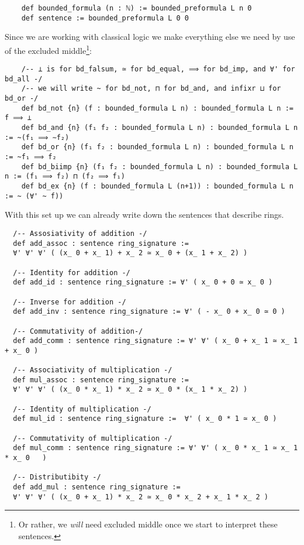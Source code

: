 \begin{dfn}[Formulas]
\begin{lstlisting}
    def bounded_formula (n : ℕ) := bounded_preformula L n 0
    def sentence := bounded_preformula L 0 0\end{lstlisting}

  Since we are working with classical logic we
  make everything else we need by use of the excluded middle\footnote{
    Or rather, we \textit{will} need excluded middle once we start to
    interpret these sentences.
  }:

  \begin{lstlisting}
    /-- ⊥ is for bd_falsum, ≃ for bd_equal, ⟹ for bd_imp, and ∀' for bd_all -/
    /-- we will write ~ for bd_not, ⊓ for bd_and, and infixr ⊔ for bd_or -/
    def bd_not {n} (f : bounded_formula L n) : bounded_formula L n := f ⟹ ⊥
    def bd_and {n} (f₁ f₂ : bounded_formula L n) : bounded_formula L n := ~(f₁ ⟹ ∼f₂)
    def bd_or {n} (f₁ f₂ : bounded_formula L n) : bounded_formula L n := ~f₁ ⟹ f₂
    def bd_biimp {n} (f₁ f₂ : bounded_formula L n) : bounded_formula L n := (f₁ ⟹ f₂) ⊓ (f₂ ⟹ f₁)
    def bd_ex {n} (f : bounded_formula L (n+1)) : bounded_formula L n := ~ (∀' ~ f))
  \end{lstlisting}
\end{dfn}

With this set up we can already write down the sentences that describe rings.

\begin{lstlisting}
  /-- Assosiativity of addition -/
  def add_assoc : sentence ring_signature :=
  ∀' ∀' ∀' ( (x_ 0 + x_ 1) + x_ 2 ≃ x_ 0 + (x_ 1 + x_ 2) )

  /-- Identity for addition -/
  def add_id : sentence ring_signature := ∀' ( x_ 0 + 0 ≃ x_ 0 )

  /-- Inverse for addition -/
  def add_inv : sentence ring_signature := ∀' ( - x_ 0 + x_ 0 ≃ 0 )

  /-- Commutativity of addition-/
  def add_comm : sentence ring_signature := ∀' ∀' ( x_ 0 + x_ 1 ≃ x_ 1 + x_ 0 )

  /-- Associativity of multiplication -/
  def mul_assoc : sentence ring_signature :=
  ∀' ∀' ∀' ( (x_ 0 * x_ 1) * x_ 2 ≃ x_ 0 * (x_ 1 * x_ 2) )

  /-- Identity of multiplication -/
  def mul_id : sentence ring_signature :=  ∀' ( x_ 0 * 1 ≃ x_ 0 )

  /-- Commutativity of multiplication -/
  def mul_comm : sentence ring_signature := ∀' ∀' ( x_ 0 * x_ 1 ≃ x_ 1 * x_ 0   )

  /-- Distributibity -/
  def add_mul : sentence ring_signature :=
  ∀' ∀' ∀' ( (x_ 0 + x_ 1) * x_ 2 ≃ x_ 0 * x_ 2 + x_ 1 * x_ 2 )\end{lstlisting}

